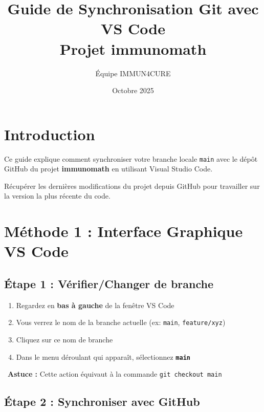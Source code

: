 \documentclass[a4paper,11pt]{article}
\title{\textbf{Guide de Synchronisation Git avec VS Code}\\
\large Projet immunomath}
\author{Équipe IMMUN4CURE}
\date{Octobre 2025}
\begin{document}
\maketitle

\section*{Introduction}

Ce guide explique comment synchroniser votre branche locale \texttt{main} avec le dépôt GitHub du projet \textbf{immunomath} en utilisant Visual Studio Code.

\vspace{0.5cm}

\begin{tcolorbox}[colback=vscodeblue!5,colframe=vscodeblue,title={\faInfoCircle\ Objectif}]
Récupérer les dernières modifications du projet depuis GitHub pour travailler sur la version la plus récente du code.
\end{tcolorbox}

\section{Méthode 1 : Interface Graphique VS Code \faMousePointer}

\subsection*{Étape 1 : Vérifier/Changer de branche}

\begin{enumerate}[leftmargin=2cm]
    \item Regardez en \textbf{bas à gauche} de la fenêtre VS Code
    \item Vous verrez le nom de la branche actuelle (ex: \texttt{main}, \texttt{feature/xyz})
    \item Cliquez sur ce nom de branche
    \item Dans le menu déroulant qui apparaît, sélectionnez \texttt{\textbf{main}}
\end{enumerate}

\begin{tcolorbox}[colback=commandbg,colframe=gray,leftrule=3mm]
\faLightbulb\ \textbf{Astuce :} Cette action équivaut à la commande \texttt{git checkout main}
\end{tcolorbox}

\subsection*{Étape 2 : Synchroniser avec GitHub}
\end{document}
